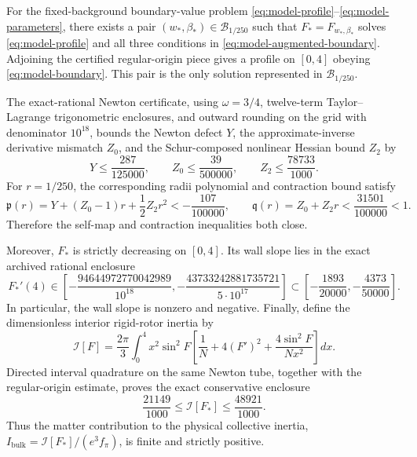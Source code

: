\begin{theorem}
\label{thm:main}
For the fixed-background boundary-value problem
\eqref{eq:model-profile}--\eqref{eq:model-parameters}, there exists a pair
\((w_*,\beta_*)\in\mathcal B_{1/250}\) such that \(F_*=F_{w_*,\beta_*}\)
solves \eqref{eq:model-profile} and all three conditions in
\eqref{eq:model-augmented-boundary}.  Adjoining the certified regular-origin
piece gives a profile on \([0,4]\) obeying \eqref{eq:model-boundary}.  This pair
is the only solution represented in \(\mathcal B_{1/250}\).

The exact-rational Newton certificate, using \(\omega=3/4\), twelve-term
Taylor--Lagrange trigonometric enclosures, and outward rounding on the grid
with denominator \(10^{18}\), bounds the Newton defect \(Y\), the
approximate-inverse derivative mismatch \(Z_0\), and the Schur-composed
nonlinear Hessian bound \(Z_2\) by
\begin{equation}
  Y\le\frac{287}{125000},
  \qquad
  Z_0\le\frac{39}{500000},
  \qquad
  Z_2\le\frac{78733}{1000}.
  \label{eq:model-newton-bounds}
\end{equation}
For \(r=1/250\), the corresponding radii polynomial and contraction bound
satisfy
\begin{equation}
  \mathfrak p(r)
  =Y+(Z_0-1)r+\frac12Z_2r^2
    <-\frac{107}{100000},
  \qquad
  \mathfrak q(r)=Z_0+Z_2r<\frac{31501}{100000}<1.
  \label{eq:model-radii-closure}
\end{equation}
Therefore the self-map and contraction inequalities both close.

Moreover, \(F_*\) is strictly decreasing on \([0,4]\).  Its wall slope lies
in the exact archived rational enclosure
\begin{equation}
  F_*'(4)\in
  \left[
    -\frac{94644972770042989}{10^{18}},
    -\frac{43733242881735721}{5\cdot10^{17}}
  \right]
  \subset
  \left[-\frac{1893}{20000},-\frac{4373}{50000}\right].
  \label{eq:model-wall-slope}
\end{equation}
In particular, the wall slope is nonzero and negative.  Finally, define the
dimensionless interior rigid-rotor inertia by
\begin{equation}
  \mathcal I[F]
  =\frac{2\pi}{3}\int_0^4x^2\sin^2F
     \left[
       \frac1N+4(F')^2+\frac{4\sin^2F}{Nx^2}
     \right]dx.
  \label{eq:model-inertia}
\end{equation}
Directed interval quadrature on the same Newton tube, together with the
regular-origin estimate, proves the exact conservative enclosure
\begin{equation}
  \frac{21149}{1000}
  \le \mathcal I[F_*]
  \le \frac{48921}{1000}.
  \label{eq:model-inertia-bound}
\end{equation}
Thus the matter contribution to the physical collective inertia,
\(I_{\mathrm{bulk}}=\mathcal I[F_*]/(e^3f_\pi)\), is finite and strictly
positive.
\end{theorem}

